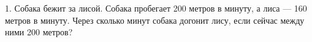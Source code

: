 1. Собака бежит за лисой. Собака пробегает 200 метров в минуту, а лиса --- 160 метров в минуту. Через сколько минут собака догонит лису, если сейчас между ними 200 метров?\\
